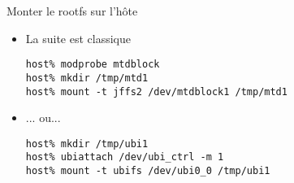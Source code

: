 \begin{frame}[fragile=singleslide]{Monter le rootfs sur l'hôte}
  \begin{itemize}
\item La suite est classique
    \begin{lstlisting}
host% modprobe mtdblock
host% mkdir /tmp/mtd1
host% mount -t jffs2 /dev/mtdblock1 /tmp/mtd1
     \end{lstlisting}
     \item ... ou...
    \begin{lstlisting}
host% mkdir /tmp/ubi1
host% ubiattach /dev/ubi_ctrl -m 1
host% mount -t ubifs /dev/ubi0_0 /tmp/ubi1
     \end{lstlisting}
  \end{itemize}
\end{frame}

% 

